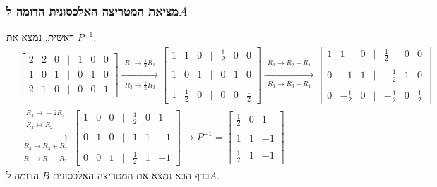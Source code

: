 \documentclass[11pt, oneside]{article}
\newcommand{\opr}[1]{\xrightarrow[\text{#1}]{}}
\newcommand{\oprm}[2][]{\overset{\substack{#1}}{\underset{\substack{#2}}{\longrightarrow}}}
\newcommand{\bidiarrow}[1]{\underset{\text{#1}}{\leftrightarrow}}
\begin{document}
\subsubsection{מציאת המטריצה האלכסונית הדומה ל$A$}
ראשית, נמצא את $P^{-1}$:
\begin{align*}
& \begin{bmatrix}
2 & 2 & 0 & \mid & 1 & 0 & 0\\
1 & 0 & 1 & \mid & 0 & 1 & 0\\
2 & 1 & 0 & \mid & 0 & 0 & 1
\end{bmatrix} \oprm[%
  R_1 \opr{} \frac{1}{2}R_1
]{%
  R_3 \opr{} \frac{1}{2}R_3
}
\begin{bmatrix}
1 & 1 & 0 & \mid & \frac{1}{2} & 0 & 0\\\\
1 & 0 & 1 & \mid & 0 & 1 & 0\\\\
1 & \frac{1}{2} & 0 & \mid & 0 & 0 & \frac{1}{2}
\end{bmatrix} \oprm[%
  R_2 \opr{} R_2 - R_1
]{%
  R_3 \opr{} R_3 - R_1
}
\begin{bmatrix}
1 & 1 & 0 & \mid & \frac{1}{2} & 0 & 0\\\\
0 & -1 & 1 & \mid & -\frac{1}{2} & 1 & 0\\\\
0 & -\frac{1}{2} & 0 & \mid & -\frac{1}{2} & 0 & \frac{1}{2}
\end{bmatrix}\\
& \oprm[%
  R_3 \opr{} -2R_3\\
  R_3 \bidiarrow{} R_2
]{%
  R_3 \opr{} R_3 + R_2\\
  R_1 \opr{} R_1 - R_2
} \begin{bmatrix}
1 & 0 & 0 & \mid & \frac{1}{2} & 0 & 1\\\\
0 & 1 & 0 & \mid & 1 & 1 & -1\\\\
0 & 0 & 1 & \mid & \frac{1}{2} & 1 & -1
\end{bmatrix} \opr{}
P^{-1} = \begin{bmatrix}
\frac{1}{2} & 0 & 1\\\\
1 & 1 & -1\\\\
\frac{1}{2} & 1 & -1
\end{bmatrix}
\end{align*}
בדף הבא נמצא את המטריצה האלכסונית $B$ הדומה ל$A$.
\clearpage
\setcounter{subsubsection}{2}
\end{document}
